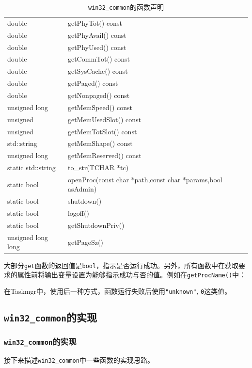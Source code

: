 \documentclass{beamer}
\newcommand\code[1]{\texttt{#1}}
\begin{document}
\begin{frame}
\begin{table}[htbp]
\begin{tabular}{>{\raggedleft\arraybackslash}p{18em}p{24em}}
        double & getPhyTot() const \\
        double & getPhyAvail() const \\
        double & getPhyUsed() const \\
        double & getCommTot() const \\
        double & getSysCache() const \\
        double & getPaged() const \\
        double & getNonpaged() const \\
        unsigned long & getMemSpeed() const \\
        unsigned & getMemUsedSlot() const \\
        unsigned & getMemTotSlot() const \\
        std::string & getMemShape() const \\
        unsigned long & getMemReserved() const \\
        static std::string & to\_str(TCHAR *tc) \\
        static bool & openProc(const char *path,const char *params,bool asAdmin) \\
        static bool & shutdown() \\
        static bool & logoff() \\
        static bool & getShutdownPriv() \\
        unsigned long long & getPageSz() \\
        \hline
    \end{tabular}
    \caption{\code{win32\_common}的函数声明}
    \label{table:win32func}
\end{table}
\end{frame}

\begin{frame}
大部分\code{get}函数的返回值是\code{bool}，指示是否运行成功。另外，所有函数中在获取要求的属性前将输出变量设置为能够指示成功与否的值。例如在\code{getProcName()}中：

{
    \ttfamily
    
}

在Taskmgr中，使用后一种方式，函数运行失败后使用\code{"unknown"}, \code{0}这类值。
\end{frame}

\subsection{\code{win32\_common}的实现}
\begin{frame}
    \frametitle{\code{win32\_common}的实现}
接下来描述\code{win32\_common}中一些函数的实现思路。
\end{frame}
\end{document}
